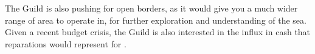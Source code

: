 \documentclass[blue]{NeptuneBall}
\begin{document}
The Guild is also pushing for open borders, as it would give you a much wider range of area to operate in, for further exploration and understanding of the sea. Given a recent budget crisis, the Guild is also interested in the influx in cash that reparations would represent for \pAtlantis{}.

\end{document}
